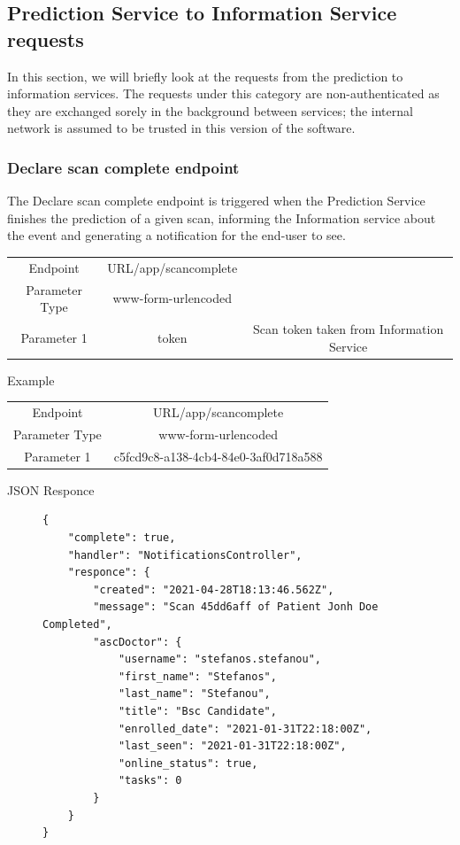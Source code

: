 			\subsection{Prediction Service to Information Service requests}
				In this section, we will briefly look at the requests from the prediction to information services. The requests under this category are non-authenticated 
				as they are exchanged sorely in the background between services; the internal network is assumed to be trusted in this version of the software.
				\subsubsection{Declare scan complete endpoint}
					\label{declare-scan-complete-endpoint}
					The Declare scan complete endpoint is triggered when the Prediction Service finishes the prediction of a given scan, informing 
					the Information service about the event and generating a notification for the end-user to see.
					\begin{center}
						\begin{tabular}{ |c|c|c| } 
							\hline
							Endpoint & {{URL}}/app/scancomplete& \\
							Parameter Type & www-form-urlencoded  &\\
							Parameter 1 & token  & Scan token taken from Information Service\\
							\hline
						\end{tabular}
					\end{center}
					Example
					\begin{center}
						\begin{tabular}{ |c|c| } 
							\hline
							Endpoint & {{URL}}/app/scancomplete \\
							Parameter Type & www-form-urlencoded  \\
							Parameter 1 & c5fcd9c8-a138-4cb4-84e0-3af0d718a588 \\
							\hline
						\end{tabular}
					\end{center}
					JSON Responce
					\begin{figure}[H]
						\iftrue
						\begin{lstlisting}[]
{
	"complete": true,
	"handler": "NotificationsController",
	"responce": {
		"created": "2021-04-28T18:13:46.562Z",
		"message": "Scan 45dd6aff of Patient Jonh Doe Completed",
		"ascDoctor": {
			"username": "stefanos.stefanou",
			"first_name": "Stefanos",
			"last_name": "Stefanou",
			"title": "Bsc Candidate",
			"enrolled_date": "2021-01-31T22:18:00Z",
			"last_seen": "2021-01-31T22:18:00Z",
			"online_status": true,
			"tasks": 0
		}
	}
}
						\end{lstlisting}
					\end{figure}
